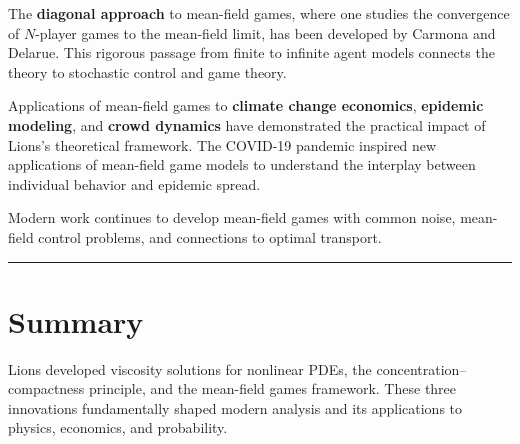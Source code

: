 The \textbf{diagonal approach} to mean-field games, where one
studies the convergence of $N$-player games to the mean-field
limit, has been developed by Carmona and Delarue.  This rigorous
passage from finite to infinite agent models connects the theory to
stochastic control and game theory.

Applications of mean-field games to \textbf{climate change
economics}, \textbf{epidemic modeling}, and \textbf{crowd dynamics}
have demonstrated the practical impact of Lions's theoretical
framework.  The COVID-19 pandemic inspired new applications of
mean-field game models to understand the interplay between
individual behavior and epidemic spread.

Modern work continues to develop mean-field games with common
noise, mean-field control problems, and connections to optimal
transport.

\begin{center}\rule{0.5\linewidth}{0.5pt}\end{center}

\section*{Summary}

Lions developed viscosity solutions for nonlinear PDEs, the
concentration--compactness principle, and the mean-field games
framework.  These three innovations fundamentally shaped modern
analysis and its applications to physics, economics, and
probability.

